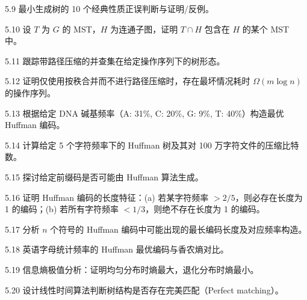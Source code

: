 \begin{exercise}{5.9}
最小生成树的 10 个经典性质正误判断与证明/反例。
\end{exercise}

\begin{exercise}{5.10}
设 $T$ 为 $G$ 的 MST，$H$ 为连通子图，证明 $T \cap H$ 包含在 $H$ 的某个 MST 中。
\end{exercise}

\begin{exercise}{5.11}
跟踪带路径压缩的并查集在给定操作序列下的树形态。
\end{exercise}

\begin{exercise}{5.12}
证明仅使用按秩合并而不进行路径压缩时，存在最坏情况耗时 $\Omega(m \log n)$ 的操作序列。
\end{exercise}

\begin{exercise}{5.13}
根据给定 DNA 碱基频率（A: 31\%, C: 20\%, G: 9\%, T: 40\%）构造最优 Huffman 编码。
\end{exercise}

\begin{exercise}{5.14}
计算给定 5 个字符频率下的 Huffman 树及其对 100 万字符文件的压缩比特数。
\end{exercise}

\begin{exercise}{5.15}
探讨给定前缀码是否可能由 Huffman 算法生成。
\end{exercise}

\begin{exercise}{5.16}
证明 Huffman 编码的长度特征：(a) 若某字符频率 $> 2/5$，则必存在长度为 1 的编码；(b) 若所有字符频率 $< 1/3$，则绝不存在长度为 1 的编码。
\end{exercise}

\begin{exercise}{5.17}
分析 $n$ 个符号的 Huffman 编码中可能出现的最长编码长度及对应频率构造。
\end{exercise}

\begin{exercise}{5.18}
英语字母统计频率的 Huffman 最优编码与香农熵对比。
\end{exercise}

\begin{exercise}{5.19}
信息熵极值分析：证明均匀分布时熵最大，退化分布时熵最小。
\end{exercise}

\begin{exercise}{5.20}
设计线性时间算法判断树结构是否存在完美匹配（Perfect matching）。
\end{exercise}

